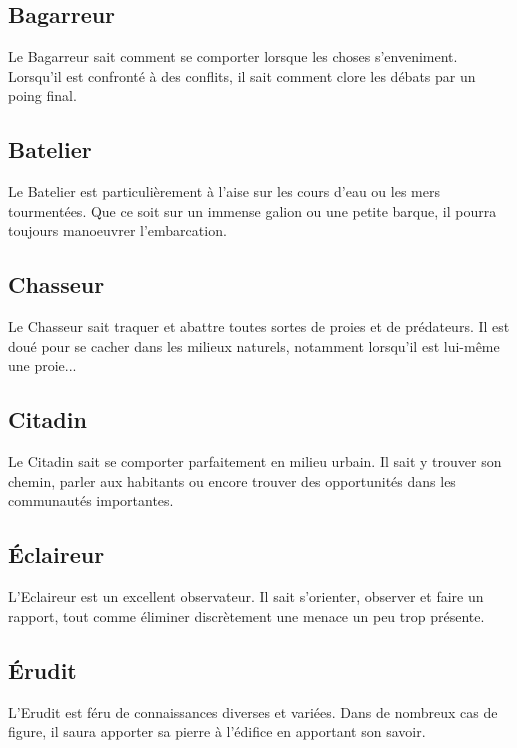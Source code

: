 \documentclass[10pt,twoside,twocolumn,openany,bg=print,justified]{dndbook}
\begin{document}
\subsection*{Bagarreur}

Le Bagarreur sait comment se comporter lorsque les choses s'enveniment. Lorsqu'il est confronté à des conflits, il sait comment clore les débats par un poing final.

\subsection*{Batelier}

Le Batelier est particulièrement à l'aise sur les cours d'eau ou les mers tourmentées. Que ce soit sur un immense galion ou une petite barque, il pourra toujours manoeuvrer l'embarcation.

\subsection*{Chasseur}

Le Chasseur sait traquer et abattre toutes sortes de proies et de prédateurs. Il est doué pour se cacher dans les milieux naturels, notamment lorsqu'il est lui-même une proie...

\subsection*{Citadin}

Le Citadin sait se comporter parfaitement en milieu urbain. Il sait y trouver son chemin, parler aux habitants ou encore trouver des opportunités dans les communautés importantes.

\subsection*{Éclaireur}

L'Eclaireur est un excellent observateur. Il sait s'orienter, observer et faire un rapport, tout comme éliminer discrètement une menace un peu trop présente.

\subsection*{Érudit}

L'Erudit est féru de connaissances diverses et variées. Dans de nombreux cas de figure, il saura apporter sa pierre à l'édifice en apportant son savoir.
\end{document}
